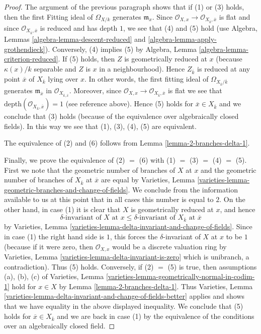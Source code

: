 \begin{proof}
\medskip\noindent
The argument of the previous paragraph shows that if (1) or (3) holds, then
the first Fitting ideal of $\Omega_{X/k}$ generates $\mathfrak m_x$.
Since $\mathcal{O}_{X, x} \to \mathcal{O}_{X_{\overline{k}}, \overline{x}}$
is flat and since $\mathcal{O}_{X_{\overline{k}}, \overline{x}}$
is reduced and has depth $1$, we see that (4) and (5) hold
(use Algebra, Lemmas \ref{algebra-lemma-descent-reduced} and
\ref{algebra-lemma-apply-grothendieck}).
Conversely, (4) implies (5) by
Algebra, Lemma \ref{algebra-lemma-criterion-reduced}.
If (5) holds, then $Z$ is geometrically reduced at $x$
(because $\kappa(x)/k$ separable and $Z$ is $x$ in a neighbourhood).
Hence $Z_{\overline{k}}$ is reduced at any point $\overline{x}$
of $X_{\overline{k}}$ lying over $x$. In other words, the first
fitting ideal of $\Omega_{X_{\overline{k}}/\overline{k}}$ generates
$\mathfrak m_{\overline{x}}$ in $\mathcal{O}_{X_{\overline{k}, \overline{x}}}$.
Moreover, since
$\mathcal{O}_{X, x} \to \mathcal{O}_{X_{\overline{k}}, \overline{x}}$ is flat
we see that $\text{depth}(\mathcal{O}_{X_{\overline{k}}, \overline{x}}) = 1$
(see reference above).
Hence (5) holds for $\overline{x} \in X_{\overline{k}}$ and we
conclude that (3) holds (because of the equivalence over algebraically
closed fields). In this way we see that (1), (3), (4), (5)
are equivalent.

\medskip\noindent
The equivalence of (2) and (6) follows from
Lemma \ref{lemma-2-branches-delta-1}.

\medskip\noindent
Finally, we prove the equivalence of (2) $=$ (6) with
(1) $=$ (3) $=$ (4) $=$ (5). First we note that the geometric number
of branches of $X$ at $x$ and the geometric number of branches
of $X_{\overline{k}}$ at $\overline{x}$ are equal by
Varieties, Lemma
\ref{varieties-lemma-geometric-branches-and-change-of-fields}.
We conclude from the information available to us at this point
that in all cases this number is equal to $2$.
On the other hand, in case (1) it is clear that $X$ is geometrically
reduced at $x$, and hence
$$
\delta\text{-invariant of }X\text{ at }x \leq
\delta\text{-invariant of }X_{\overline{k}}\text{ at }\overline{x}
$$
by Varieties, Lemma \ref{varieties-lemma-delta-invariant-and-change-of-fields}.
Since in case (1) the right hand side is $1$, this
forces the $\delta$-invariant of $X$ at $x$ to be $1$
(because if it were zero, then $\mathcal{O}_{X, x}$ would
be a discrete valuation ring by
Varieties, Lemma \ref{varieties-lemma-delta-invariant-is-zero}
which is unibranch, a contradiction). Thus (5) holds.
Conversely, if (2) $=$ (5) is true, then assumptions (a), (b), (c) of
Varieties, Lemma \ref{varieties-lemma-geometrically-normal-in-codim-1}
hold for $x \in X$ by
Lemma \ref{lemma-2-branches-delta-1}. Thus
Varieties, Lemma
\ref{varieties-lemma-delta-invariant-and-change-of-fields-better}
applies and shows that we have equality in the above displayed inequality.
We conclude that (5) holds for $\overline{x} \in X_{\overline{k}}$
and we are back in case (1) by the equivalence of the conditions
over an algebraically closed field.
\end{proof}


